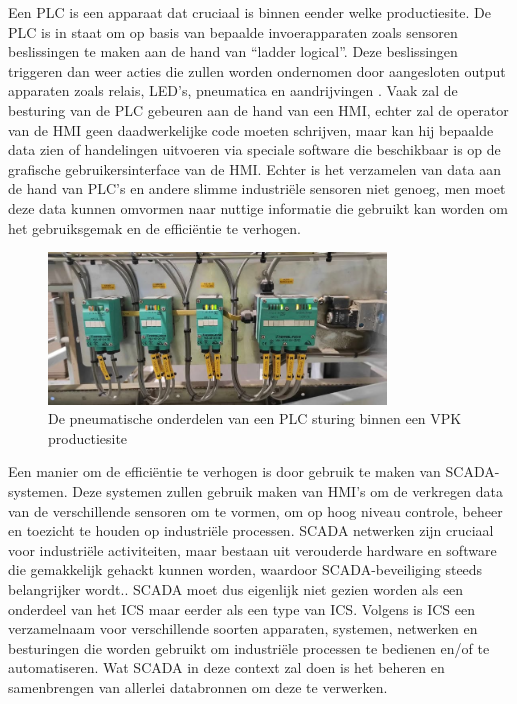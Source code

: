Een PLC is een apparaat dat cruciaal is binnen eender welke productiesite. De PLC is in staat om op basis van bepaalde invoerapparaten zoals sensoren beslissingen te maken aan de hand van “ladder logical”. Deze beslissingen triggeren dan weer acties die zullen worden ondernomen door aangesloten output apparaten zoals relais, LED’s, pneumatica en aandrijvingen \autocite{unitronics2025}.
Vaak zal de besturing van de PLC gebeuren aan de hand van een HMI, echter zal de operator van de HMI geen daadwerkelijke code moeten schrijven, maar kan hij bepaalde data zien of handelingen uitvoeren via speciale software die beschikbaar is op de grafische gebruikersinterface van de HMI. 
Echter is het verzamelen van data aan de hand van PLC’s en andere slimme industriële sensoren niet genoeg, men moet deze data kunnen omvormen naar nuttige informatie die gebruikt kan worden om het gebruiksgemak en de efficiëntie te verhogen. 

\begin{figure}[H]
    \centering
    \includegraphics[width=0.8\textwidth]{fotos/PLC_pneumatica.jpg}
    \caption[Pneumatica PLC]{\label{fig:grail}De pneumatische onderdelen van een PLC sturing binnen een VPK productiesite}
\end{figure} 

Een manier om de efficiëntie te verhogen is door gebruik te maken van SCADA-systemen. 
Deze systemen zullen gebruik maken van HMI’s om de verkregen data van de verschillende sensoren om te vormen, om op hoog niveau controle, beheer en toezicht te houden op industriële processen. SCADA netwerken zijn cruciaal voor industriële activiteiten, maar bestaan uit verouderde hardware en software die gemakkelijk gehackt kunnen worden, waardoor SCADA-beveiliging steeds belangrijker wordt.\autocite{FortinetSC2025}. SCADA moet dus eigenlijk niet gezien worden als een onderdeel van het ICS maar eerder als een type van ICS. 
Volgens \textcite{Mhaskar2021} is ICS een verzamelnaam voor verschillende soorten apparaten, systemen, netwerken en besturingen die worden gebruikt om industriële processen te bedienen en/of te automatiseren. Wat SCADA in deze context zal doen is het beheren en samenbrengen van allerlei databronnen om deze te verwerken.


